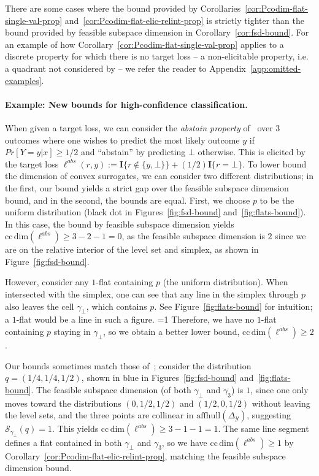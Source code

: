 \documentclass[anon,12pt]{colt2021} %
\newcommand{\Comments}{1}
\newcommand{\mytodo}[2]{\ifnum\Comments=1%
	\todo[linecolor=#1!80!black,backgroundcolor=#1,bordercolor=#1!80!black]{#2}\fi}
\newcommand{\raft}[1]{\mytodo{green!20!white}{RF: #1}}
\newcommand{\jessiet}[1]{\mytodo{purple!20!white}{JF: #1}}
\newcommand{\simplex}{\Delta_\Y}
\newcommand{\ccdim}{\mathrm{cc\,dim}}
\newcommand{\affhull}{\mathrm{affhull}}
\newcommand{\Sc}{\mathcal{S}}  %
\newcommand{\Y}{\mathcal{Y}}
\newcommand{\Ind}[1]{\mathbf{I}\{{#1}\}}
\begin{document}
There are some cases where the bound provided by Corollaries~\ref{cor:Pcodim-flat-single-val-prop} and~\ref{cor:Pcodim-flat-elic-relint-prop} is strictly tighter than the bound provided by feasible subspace dimension in Corollary~\ref{cor:fsd-bound}.
For an example of how Corollary~\ref{cor:Pcodim-flat-single-val-prop} applies to a discrete property for which there is no target loss -- a non-elicitable property, i.e. a quadrant not considered by \citet{ramaswamy2018consistent} -- we refer the reader to Appendix~\ref{app:omitted-examples}.

\paragraph{Example: New bounds for high-confidence classification.}\label{subsec:examples-finite}
When given a target loss, we can consider the \emph{abstain property} of~\citet{ramaswamy2018consistent} over 3 outcomes where one wishes to predict the most likely outcome $y$ if $Pr[Y=y|x] \geq 1/2$ and ``abstain'' by predicting $\bot$ otherwise.
This is elicited by the target loss $\ell^{abs}(r,y) := \Ind{r \not \in \{y, \bot\}} + (1/2)\Ind{r = \bot}$. 
To lower bound the dimension of convex surrogates, we can consider two different distributions; in the first, our bound yields a strict gap over the feasible subspace dimension bound, and in the second, the bounds are equal.
First, we choose $p$ to be the uniform distribution (black dot in Figures~\ref{fig:fsd-bound} and~\ref{fig:flats-bound}).
In this case, the bound by feasible subspace dimension yields $\ccdim(\ell^{abs}) \geq 3 - 2 - 1 = 0$, as the feasible subspace dimension is $2$ since we are on the relative interior of the level set and simplex, as shown in Figure~\ref{fig:fsd-bound}.

However, consider any $1$-flat containing $p$ (the uniform distribution).
When intersected with the simplex, one can see that any line in the simplex through $p$ also leaves the cell $\gamma_\bot$, which contains $p$.
See Figure~\ref{fig:flats-bound} for intuition; a $1$-flat would be a line in such a figure. \jessiet{Justify why}
Therefore, we have no $1$-flat containing $p$ staying in $\gamma_\bot$, so we obtain a better lower bound, $\ccdim(\ell^{abs}) \geq 2$.

Our bounds sometimes match those of~\citep{ramaswamy2016convex}; consider the distribution $q = (1/4, 1/4, 1/2)$, shown in blue in Figures~\ref{fig:fsd-bound} and~\ref{fig:flats-bound}.
The feasible subspace dimension (of both $\gamma_\bot$ and $\gamma_3$) is $1$, since one only moves toward the distributions $(0,1/2, 1/2)$ and $(1/2, 0, 1/2)$ without leaving the level sets, and the three points are collinear in $\affhull(\simplex)$, suggesting $\Sc_{\gamma_\bot}(q) = 1$.  
This yields $\ccdim(\ell^{abs}) \geq 3 - 1- 1 = 1$.
The same line segment defines a flat contained in both $\gamma_\bot$ and $\gamma_3$, so we have $\ccdim(\ell^{abs}) \geq 1$ by Corollary~\ref{cor:Pcodim-flat-elic-relint-prop}, matching the feasible subspace dimension bound.
\end{document}
